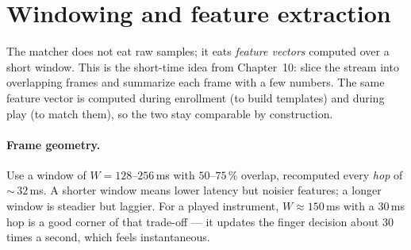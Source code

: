 \section{Windowing and feature extraction}
\label{ch41:features}

The matcher does not eat raw samples; it eats \emph{feature vectors} computed
over a short window. This is the short-time idea from Chapter~10: slice the
stream into overlapping frames and summarize each frame with a few numbers. The
same feature vector is computed during enrollment (to build templates) and during
play (to match them), so the two stay comparable by construction.

\paragraph{Frame geometry.} Use a window of $W = 128$--$256\,$ms with
$50$--$75\,\%$ overlap, recomputed every \emph{hop} of $\sim$\,$32\,$ms. A
shorter window means lower latency but noisier features; a longer window is
steadier but laggier. For a played instrument, $W \approx 150\,$ms with a
$30\,$ms hop is a good corner of that trade-off --- it updates the finger
decision about $30$ times a second, which feels instantaneous.


